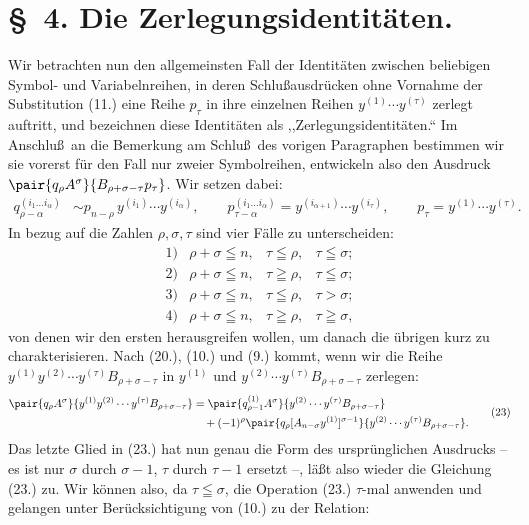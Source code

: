 \section*{\S\ 4. Die Zerlegungsidentit\"aten.}
Wir betrachten nun den allgemeinsten Fall der Identit\"aten zwischen beliebigen Symbol- und Variabelnreihen, in deren Schlu\ss ausdr\"ucken ohne Vornahme der Substitution (11.) eine Reihe $p_\tau$ in ihre einzelnen Reihen $y^{(1)}\cdots y^{(\tau)}$ zerlegt auftritt, und bezeichnen diese Identit\"aten als ,,Zerlegungsidentit\"aten.`` Im Anschlu\ss\ an die Bemerkung am Schlu\ss\ des vorigen Paragraphen bestimmen wir sie vorerst f\"ur den Fall nur zweier Symbolreihen, entwickeln also den Ausdruck $\pair{q_\rho A^\sigma}{B_{\rho+\sigma-\tau}p_\tau}$. Wir setzen dabei:
\begin{equation}
\begin{aligned}
q_{\rho-\alpha}^{(i_1\ldots i_\alpha)}&\sim p_{n-\rho}\,y^{(i_1)}\cdots y^{(i_\alpha)},\qquad
p_{\tau-\alpha}^{(i_1\ldots i_\alpha)}=y^{(i_{\alpha+1})}\cdots y^{(i_\tau)},\qquad
p_\tau=y^{(1)}\cdots y^{(\tau)}.
\end{aligned}
\tag{22}
\end{equation}
In bezug auf die Zahlen $\rho,\sigma,\tau$ sind vier F\"alle zu unterscheiden:
\[
\begin{array}{llll}
1)&\rho+\sigma\leqq n,& \tau\leqq\rho,& \tau\leqq\sigma;\\[2pt]
2)&\rho+\sigma\leqq n,& \tau\geqq\rho,& \tau\leqq\sigma;\\[2pt]
3)&\rho+\sigma\leqq n,& \tau\leqq\rho,& \tau>\sigma;\\[2pt]
4)&\rho+\sigma\leqq n,& \tau\geqq\rho,& \tau\geqq\sigma,
\end{array}
\]
von denen wir den ersten herausgreifen wollen, um danach die \"ubrigen kurz zu charakterisieren. Nach (20.), (10.) und (9.) kommt, wenn wir die Reihe $y^{(1)}y^{(2)}\cdots y^{(\tau)}B_{\rho+\sigma-\tau}$ in $y^{(1)}$ und $y^{(2)}\cdots y^{(\tau)}B_{\rho+\sigma-\tau}$ zerlegen:
\begin{equation}
\begin{aligned}
\pair{q_\rho A^\sigma}{y^{(1)}y^{(2)}\cdots y^{(\tau)}B_{\rho+\sigma-\tau}}
&=\pair{q_{\rho-1}^{(1)}A^\sigma}{y^{(2)}\cdots y^{(\tau)}B_{\rho+\sigma-\tau}}\\
&\quad+(-1)^\rho\pair{q_\rho[A_{n-\sigma}y^{(1)}]^{\sigma-1}}{y^{(2)}\cdots y^{(\tau)}B_{\rho+\sigma-\tau}}.
\end{aligned}
\tag{23}
\end{equation}
Das letzte Glied in (23.) hat nun genau die Form des urspr\"unglichen Ausdrucks -- es ist nur $\sigma$ durch $\sigma-1$, $\tau$ durch $\tau-1$ ersetzt --, l\"a\ss t also wieder die Gleichung (23.) zu. Wir k\"onnen also, da $\tau\leqq\sigma$, die Operation (23.) $\tau$-mal anwenden und gelangen unter Ber\"ucksichtigung von (10.) zu der Relation:
